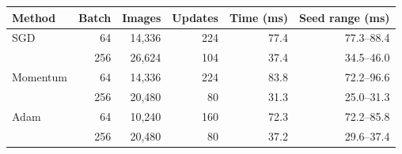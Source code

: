 \begin{tabular}{@{}lrrrrr@{}}
\toprule
Method & Batch & Images & Updates & Time (ms) & Seed range (ms) \\
\midrule
SGD & 64 & 14,336 & 224 & 77.4 & 77.3--88.4 \\
 & 256 & 26,624 & 104 & 37.4 & 34.5--46.0 \\
\addlinespace[2pt]
Momentum & 64 & 14,336 & 224 & 83.8 & 72.2--96.6 \\
 & 256 & 20,480 & 80 & 31.3 & 25.0--31.3 \\
\addlinespace[2pt]
Adam & 64 & 10,240 & 160 & 72.3 & 72.2--85.8 \\
 & 256 & 20,480 & 80 & 37.2 & 29.6--37.4 \\
\bottomrule
\end{tabular}
